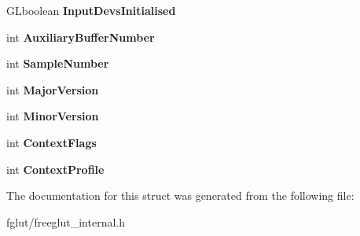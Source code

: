 \begin{DoxyCompactItemize}
\item 
G\+Lboolean {\bfseries Input\+Devs\+Initialised}\hypertarget{structtag_s_f_g___state_ad37d0414dac96bb886f2ec133c22d68f}{}\label{structtag_s_f_g___state_ad37d0414dac96bb886f2ec133c22d68f}

\item 
int {\bfseries Auxiliary\+Buffer\+Number}\hypertarget{structtag_s_f_g___state_a107f4b02c185ebd25cfad562d8548101}{}\label{structtag_s_f_g___state_a107f4b02c185ebd25cfad562d8548101}

\item 
int {\bfseries Sample\+Number}\hypertarget{structtag_s_f_g___state_a97dc1e80320f3b020e569a14bfe1ff22}{}\label{structtag_s_f_g___state_a97dc1e80320f3b020e569a14bfe1ff22}

\item 
int {\bfseries Major\+Version}\hypertarget{structtag_s_f_g___state_a7af40e72c7e5848d0a99f4982a1ed966}{}\label{structtag_s_f_g___state_a7af40e72c7e5848d0a99f4982a1ed966}

\item 
int {\bfseries Minor\+Version}\hypertarget{structtag_s_f_g___state_a8af102e81f3e51d27b8e442d059d9b07}{}\label{structtag_s_f_g___state_a8af102e81f3e51d27b8e442d059d9b07}

\item 
int {\bfseries Context\+Flags}\hypertarget{structtag_s_f_g___state_a9d95a5560bc8f07cb8315e8c3763e744}{}\label{structtag_s_f_g___state_a9d95a5560bc8f07cb8315e8c3763e744}

\item 
int {\bfseries Context\+Profile}\hypertarget{structtag_s_f_g___state_af4a4d11de3572970e19eff87d410737e}{}\label{structtag_s_f_g___state_af4a4d11de3572970e19eff87d410737e}

\end{DoxyCompactItemize}


The documentation for this struct was generated from the following file\+:\begin{DoxyCompactItemize}
\item 
fglut/freeglut\+\_\+internal.\+h\end{DoxyCompactItemize}
